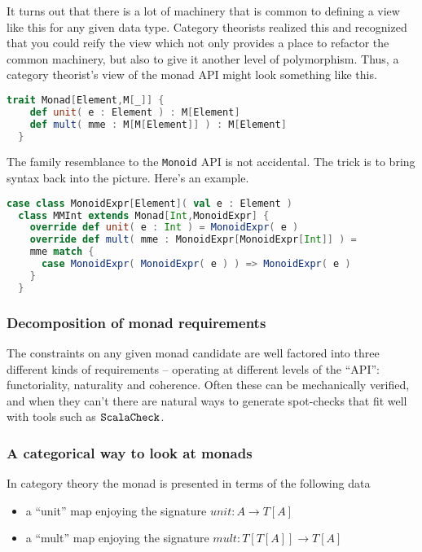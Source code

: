 It turns out that there is a lot of machinery that is common to
defining a view like this for any given data type. Category theorists
realized this and recognized that you could reify the view which not
only provides a place to refactor the common machinery, but also to
give it another level of polymorphism. Thus, a category theorist's
view of the monad API might look something like this.

\begin{lstlisting}[language=Scala]
  trait Monad[Element,M[_]] {
    def unit( e : Element ) : M[Element]
    def mult( mme : M[M[Element]] ) : M[Element] 
  }
\end{lstlisting}

The family resemblance to the \lstinline[language=Scala]!Monoid! API
is not accidental. The trick is to bring syntax back into the picture. Here's an example.

\begin{lstlisting}[language=Scala]
  case class MonoidExpr[Element]( val e : Element )
  class MMInt extends Monad[Int,MonoidExpr] {
    override def unit( e : Int ) = MonoidExpr( e )
    override def mult( mme : MonoidExpr[MonoidExpr[Int]] ) =
    mme match {
      case MonoidExpr( MonoidExpr( e ) ) => MonoidExpr( e )
    }
  }
\end{lstlisting}

\subsubsection{Decomposition of monad requirements}

The constraints on any given monad candidate are well factored into
three different kinds of requirements -- operating at different levels
of the ``API'': functoriality, naturality and coherence. Often these
can be mechanically verified, and when they can't there are natural
ways to generate spot-checks that fit well with tools such as
$\texttt{ScalaCheck}$.

\subsubsection{A categorical way to look at monads}

In category theory the monad is presented in terms of the
following data

\begin{itemize}
  \item a ``unit'' map enjoying the signature $unit : A \to T[A]$
  \item a ``mult'' map enjoying the signature $mult : T[T[A]] \to T[A]$
\end{itemize}

